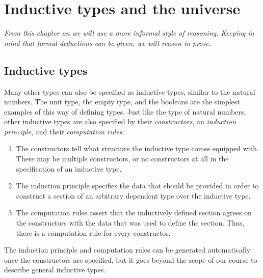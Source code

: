 \chapter{Inductive types and the universe}

\emph{From this chapter on we will use a more informal style of reasoning. Keeping in mind that formal deductions can be given, we will reason in prose.}

\section{Inductive types}

Many other types can also be specified as inductive types, similar to the natural numbers. The unit type, the empty type, and the booleans are the simplest examples of this way of defining types. Just like the type of natural numbers, other inductive types are also specified by their \emph{constructors}, an \emph{induction principle}, and their \emph{computation rules}: 
\begin{enumerate}
\item The constructors tell what structure the inductive type comes equipped with. There may be multiple constructors, or no constructors at all in the specification of an inductive type. 
\item The induction principle specifies the data that should be provided in order to construct a section of an arbitrary dependent type over the inductive type. 
\item The computation rules assert that the inductively defined section agrees on the constructors with the data that was used to define the section. Thus, there is a computation rule for every constructor.
\end{enumerate}
The induction principle and computation rules can be generated automatically once the constructors are specified, but it goes beyond the scope of our course to describe general inductive types.

